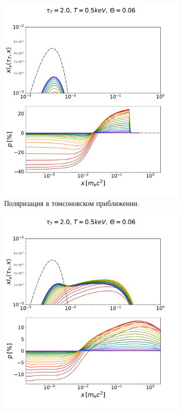 \documentclass[14pt,a4paper]{extarticle}
\begin{document}
			\begin{figure}[H]
				\centering
				\begin{subfigure}{.5\textwidth}
					\centering
					\includegraphics[width=\textwidth]{TM9zAll.pdf}
					\caption{\small\centering Поляризация в томсоновском приближении.}
				\end{subfigure}%
				\begin{subfigure}{.5\textwidth}
					\centering
					\includegraphics[width=\textwidth]{CM9zAll.pdf}

\end{subfigure}
\end{figure}
\end{document}
